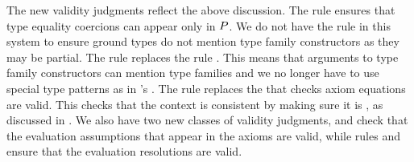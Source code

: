 \documentclass[format=acmsmall,manuscript,review,screen,nonacm,margin=1in,11pt]{acmart}
\begin{document}
The new validity judgments reflect the above discussion. The rule  ensures
that type equality coercions can appear only in $P$. We do not have the rule  in this system
to ensure ground types do not mention type family constructors as they may be partial.
The rule  replaces the rule . This means that arguments to type family
constructors can mention type families and we no longer have to use special type patterns as in \CLTF's .
The rule  replaces the  that checks axiom equations are valid. This checks that the context
is consistent by making sure it is \Good, as discussed in .
We also have two new classes of validity judgments,  and  check
that the evaluation assumptions that appear in the axioms are valid, while rules 
and  ensure that the evaluation resolutions are valid.

\newcommand\ResNil{
  \ib{\irule[\trule{v-rese}]
    {\ValidCtx \TEnv};
    {\ResTyping \TEnv \empt \empt}
  }
}
\newcommand\ResCons{
  \ib{\irule[\trule{v-resc}]
    {\ValidType \TEnv \sigma}
    {\CoTyping \TEnv \Co {\FamCtrs(\many\tau)\teq\sigma}}
    {\ResTyping \TEnv {\many q} {\many\chi[\alpha/\sigma]}};
    {\ResTyping \TEnv {(\sigma|\Co), \many q} {(\alpha|c\co\FamCtrs(\many\tau)\teq\alpha), \many \chi}}
  }
}

\newcommand\ValidQGndContextAxiom{
  \ib{\irule[\trule{v-qgax}]
    {\substack {\ValidGCtx\GEnv\\
        \fresh \Axiom\GEnv}}
    {\substack {{\many{\ValidType {\GEnv;\many\alpha_i,\TV{\many\chi}} {\tau_{0i}}}}\\
        {\many{\ValidProp{\GEnv;\empt}{\Forall{\many\alpha}{\FamCtrs(\many\tau)\teq\sigma}}}}}}
    {\substack {{\many{\ValidType {\GEnv;\many\alpha_i} {\many\tau_i}}}\\
      {\ValidAssmp {\GEnv;\many\alpha_i} {\many\chi_i}}}}
    {\FamCtrs\co n \in \GEnv};
    {\ValidGCtx{\GEnv,\Axiom\co\many{\Forall{\many\alpha~\many\chi}{\FamCtrs(\many\tau_i)\teq\tau_{0i}}}^{i<k}}}
  }
}

\newcommand\ValidNilAssmp{
  \ib{\irule[\trule{v-assmn}];
    {\ValidAssmp \TEnv \empt}}
}

\newcommand\ValidConsAssmp{
  \ib{\irule[\trule{v-assmc}]
    {\FamCtrs\co n \in \GEnv}
    {\many{\ValidType {\GEnv;\VEnv} {\tau_i}}^{i<n}}
    {\ValidAssmp {\GEnv;\VEnv,\alpha} {\many\chi}};
    {\ValidAssmp {\GEnv;\VEnv} {(\alpha|c\co\FamCtrs(\many\tau)\teq\alpha),\many\chi}}}
}
\newcommand\ValidQType{
  \ib{\irule[\trule{v-qty}]
    {\ValidProp \TEnv \Preds}
    {\ValidType \TEnv \tau};
    {\ValidType \TEnv {\Preds\then\tau}}}
}
\newcommand\ValidQTyFam{
  \ib{\irule[\trule{v-qtfp}]
    {\FamCtrs\co n \in \GEnv}
    {\many{\ValidType {\GEnv;\TEnv} {\tau_i}}^{i<n}}
    {\ValidType {\GEnv;\VEnv} \sigma};
    {\ValidProp {\GEnv;\VEnv} {\FamCtrs(\many\tau)\teq\sigma}}}
}
\end{document}

